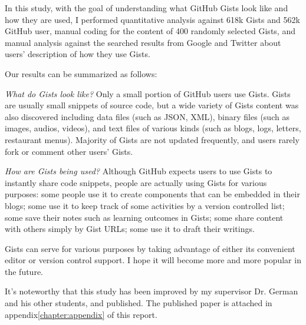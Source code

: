 In this study, with the goal of understanding what GitHub Gists look like and how they are used, I performed quantitative analysis against 618k Gists and 562k GitHub user, manual coding for the content of 400 randomly selected Gists, and manual analysis against the searched results from Google and Twitter about users' description of how they use Gists. 

Our results can be summarized as follows:

\textsl{What do Gists look like?} Only a small portion of GitHub users use Gists. Gists are usually small snippets of source code, but a wide variety of Gists content was also discovered including data files (such as JSON, XML), binary files (such as images, audios, videos), and text files of various kinds (such as blogs, logs, letters, restaurant menus). Majority of Gists are not updated frequently, and users rarely fork or comment other users' Gists.

\textsl{How are Gists being used?} Although GitHub expects users to use Gists to instantly share code snippets, people are actually using Gists for various purposes: some people use it to create components that can be embedded in their blogs; some use it to keep track of some activities by a version controlled list; some save their notes such as learning outcomes in Gists; some share content with others simply by Gist URLs; some use it to draft their writings.

Gists can serve for various purposes by taking advantage of either its convenient editor or version control support. I hope it will become more and more popular in the future.

It's noteworthy that this study has been improved by my supervisor Dr. German and his other students, and published\cite{Wang:2015:GUU:2820518.2820556}. The published paper is attached in appendix\ref{chapter:appendix} of this report.